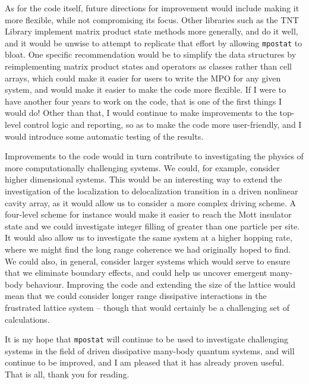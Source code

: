 As for the code itself, future directions for improvement would include making it more flexible, while not compromising its focus. Other libraries such as the TNT Library \cite{TNTlib,Al-Assam2017} implement matrix product state methods more generally, and do it well, and it would be unwise to attempt to replicate that effort by allowing \lstinline$mpostat$ to bloat. One specific recommendation would be to simplify the data structures by reimplementing matrix product states and operators as classes rather than cell arrays, which could make it easier for users to write the MPO for any given system, and would make it easier to make the code more flexible. If I were to have another four years to work on the code, that is one of the first things I would do! Other than that, I would continue to make improvements to the top-level control logic and reporting, so as to make the code more user-friendly, and I would introduce some automatic testing of the results.

Improvements to the code would in turn contribute to investigating the physics of more computationally challenging systems. We could, for example, consider higher dimensional systems. This would be an interesting way to extend the investigation of the localization to delocalization transition in a driven nonlinear cavity array, as it would allow us to consider a more complex driving scheme. A four-level scheme for instance would make it easier to reach the Mott insulator state and we could investigate integer filling of greater than one particle per site. It would also allow us to investigate the same system at a higher hopping rate, where we might find the long range coherence we had originally hoped to find. We could also, in general, consider larger systems which would serve to ensure that we eliminate boundary effects, and could help us uncover emergent many-body behaviour. Improving the code and extending the size of the lattice would mean that we could consider longer range dissipative interactions in the frustrated lattice system -- though that would certainly be a challenging set of calculations.

It is my hope that \lstinline$mpostat$ will continue to be used to investigate challenging systems in the field of driven dissipative many-body quantum systems, and will continue to be improved, and I am pleased that it has already proven useful. That is all, thank you for reading.
